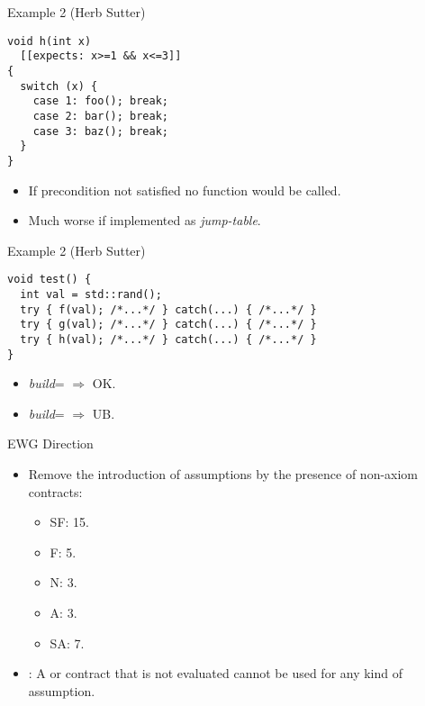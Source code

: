 \begin{frame}[t,fragile]{Example 2 (Herb Sutter)}
\begin{block}{}
\begin{lstlisting}
void h(int x)
  [[expects: x>=1 && x<=3]]
{
  switch (x) {
    case 1: foo(); break;
    case 2: bar(); break;
    case 3: baz(); break;
  }
}
\end{lstlisting}
\end{block}
\begin{itemize}
\item If precondition not satisfied no function would be called.
\item Much worse if  implemented as \emph{jump-table}.
\end{itemize}
\end{frame}

\begin{frame}[t,fragile]{Example 2 (Herb Sutter)}
\begin{block}{}
\begin{lstlisting}
void test() {
  int val = std::rand();
  try { f(val); /*...*/ } catch(...) { /*...*/ }
  try { g(val); /*...*/ } catch(...) { /*...*/ }
  try { h(val); /*...*/ } catch(...) { /*...*/ }
}
\end{lstlisting}
\end{block}
\begin{itemize}
\item \emph{build}= $\Rightarrow$ OK.
\item \emph{build}= $\Rightarrow$ UB.
\end{itemize}
\end{frame}

\begin{frame}[t]{EWG Direction}
\begin{itemize}
\item Remove the introduction of assumptions by the presence of non-axiom contracts:
\begin{itemize}  
  \item SF: 15.
  \item F: 5.
  \item N: 3.
  \item A: 3.
  \item SA: 7.
\end{itemize}

\item {}: A  or  contract that is not evaluated 
      cannot be used for any kind of assumption.
\end{itemize}
\end{frame}
